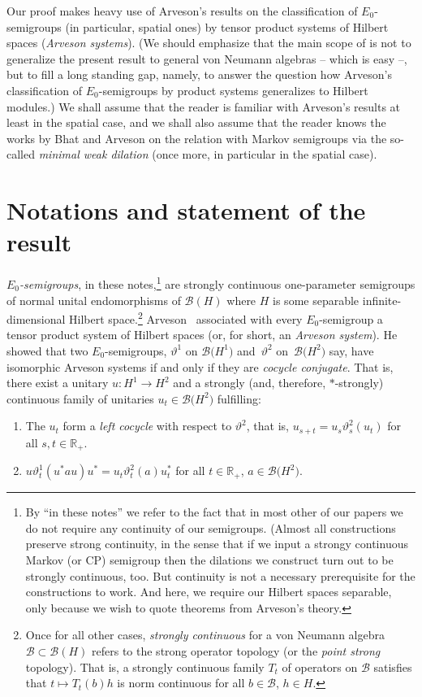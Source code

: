 \documentclass[11pt]{article}
\numberwithin{equation}{section}
\newcommand{\cmc}[1]{\mathcal{#1}}
\newcommand{\eus}[1]{\mathscr{#1}}
\newcommand{\bb}[1]{\mathbb{#1}}
\newcommand{\vt}{\vartheta}
\newcommand{\R}{\bb{R}}
\newcommand{\cB}{\cmc{B}}
\newcommand{\sB}{\eus{B}}
\numberwithin{equation}{section}
\newcommand{\bemp}{\begin{emp}}
\newcommand{\eemp}{\end{emp}}
\begin{document}
Our proof makes heavy use of Arveson's results \cite{Arv89} on the classification of $E_0$-semi\-groups (in particular, spatial ones) by tensor product systems of Hilbert spaces ({\it Arveson systems}). (We should emphasize that the main scope of \cite{Ske16} is not to generalize the present result to general von Neumann algebras -- which is easy --, but to fill a long standing gap, namely, to answer the question how Arveson's classification of $E_0$-semigroups by product systems generalizes to Hilbert modules.) We shall assume that the reader is familiar with Arveson's results at least in the spatial case, and we shall also assume that the reader knows the works by Bhat \cite{Bha96} and Arveson \cite{Arv97a} on the relation with Markov semigroups via the so-called {\it minimal weak dilation} (once more, in particular in the spatial case).

\section{Notations and statement of the result}\label{notSEC}

\bemp \label{EPS}\emph{$E_0$-semigroups}, in these notes,\footnote{By ``in these notes'' we refer to the fact that in most other of our papers we do not require any continuity of our semigroups. (Almost all constructions preserve strong continuity, in the sense that if we input a strongy continuous Markov (or CP) semigroup then the dilations we construct turn out to be strongly continuous, too. But continuity is not a necessary prerequisite for the constructions to work. And here, we require our Hilbert spaces separable, only because we wish to quote theorems from Arveson's theory.} are strongly continuous one-parameter semigroups of normal unital endomorphisms of $\sB(H)$ where $H$ is some separable infinite-dimensional Hilbert space.\footnote{Once for all other cases, \emph{strongly continuous} for a von Neumann algebra $\cB\subset\sB(H)$ refers to the strong operator topology (or the {\it point strong} topology). That is, a strongly continuous family $T_t$ of operators on $\cB$ satisfies that $t\mapsto T_t(b)h$ is norm continuous for all $b\in\cB$, $h\in H$.}
Arveson~\cite{Arv89} associated with every $E_0$-semigroup a tensor product system of Hilbert spaces (or, for short, an \emph{Arveson system}). He showed that two $E_0$-semigroups, $\vt^1$ on $\sB\big(H^1\big)$ and~$\vt^2$ on~$\sB\big(H^2\big)$ say, have isomorphic Arveson systems if and only if they are \emph{cocycle conjugate}. That is, there exist a unitary $u\colon H^1\rightarrow H^2$ and a strongly (and, therefore, $*$-strongly) continuous family of unitaries $u_t\in\sB\big(H^2\big)$ fulfilling:
\begin{enumerate}\itemsep=0pt
\item
The $u_t$ form a \emph{left cocycle} with respect to $\vt^2$, that is, $u_{s+t}=u_s\vt^2_s(u_t)$ for all $s,t\in\R_+$.

\item $u\vt^1_t(u^*au)u^*=u_t\vt^2_t(a)u_t^*$ for all $t\in\R_+$, $a\in\sB\big(H^2\big)$.
\end{enumerate}
\eemp
\end{document}
